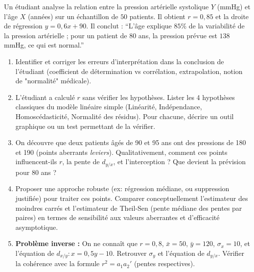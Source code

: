 \documentclass[11pt]{article}
\begin{document}
\begin{exercice}
Un étudiant analyse la relation entre la pression artérielle systolique $Y$ (mmHg) et l'âge $X$ (années) sur un échantillon de $50$ patients. Il obtient $r = 0,85$ et la droite de régression $y = 0,6x + 90$. Il conclut : ``L'âge explique $85\%$ de la variabilité de la pression artérielle ; pour un patient de 80 ans, la pression prévue est $138$ mmHg, ce qui est normal.''
\begin{enumerate}
    \item Identifier et corriger les erreurs d'interprétation dans la conclusion de l'étudiant (coefficient de détermination vs corrélation, extrapolation, notion de "normalité" médicale).
    \item L'étudiant a calculé $r$ sans vérifier les hypothèses. Lister les 4 hypothèses classiques du modèle linéaire simple (Linéarité, Indépendance, Homoscédasticité, Normalité des résidus). Pour chacune, décrire un outil graphique ou un test permettant de la vérifier.
    \item On découvre que deux patients âgés de 90 et 95 ans ont des pressions de 180 et 190 (points aberrants \textit{leviers}). Qualitativement, comment ces points influencent-ils $r$, la pente de $d_{y/x}$, et l'interception ? Que devient la prévision pour 80 ans ?
    \item Proposer une approche robuste (ex: régression médiane, ou suppression justifiée) pour traiter ces points. Comparer conceptuellement l'estimateur des moindres carrés et l'estimateur de Theil-Sen (pente médiane des pentes par paires) en termes de sensibilité aux valeurs aberrantes et d'efficacité asymptotique.
    \item \textbf{Problème inverse :} On ne connaît que $r=0,8$, $\bar{x}=50$, $\bar{y}=120$, $\sigma_x=10$, et l'équation de $d_{x/y} : x = 0,5y - 10$. Retrouver $\sigma_y$ et l'équation de $d_{y/x}$. Vérifier la cohérence avec la formule $r^2 = a_1 a_2'$ (pentes respectives).
\end{enumerate}
\end{exercice}
\end{document}

